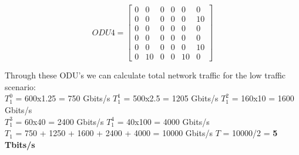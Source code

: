 \[
ODU4=
  \begin{bmatrix}
    0 & 0 & 0 & 0 & 0 & 0 \\
    0 & 0 & 0 & 0 & 0 & 10 \\
    0 & 0 & 0 & 0 & 0 & 0 \\
    0 & 0 & 0 & 0 & 0 & 0 \\
    0 & 0 & 0 & 0 & 0 & 10 \\
    0 & 10 & 0 & 0 & 10 & 0
  \end{bmatrix}
\]

\vspace{17pt}
Through these ODU's we can calculate total network traffic for the low traffic scenario:\\

$T_1^0$ = 600x1.25 = 750 Gbits/s \quad
$T_1^1$ = 500x2.5 = 1205 Gbits/s \quad
$T_1^2$ = 160x10 = 1600 Gbits/s \\

$T_1^3$ = 60x40 = 2400 Gbits/s \quad
$T_1^4$ = 40x100 = 4000 Gbits/s \\

$T_{1}$ = 750 + 1250 + 1600 + 2400 + 4000 = 10000 Gbits/s \qquad
$T$ = 10000/2 = \textbf{5 Tbits/s}\\



